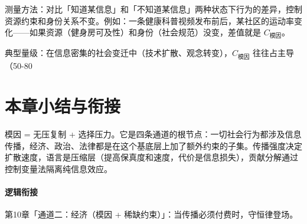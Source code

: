 \documentclass[../../main2.tex]{subfiles}
\begin{document}
	测量方法：对比「知道某信息」和「不知道某信息」两种状态下行为的差异，控制资源约束和身份关系不变。例如：一条健康科普视频发布前后，某社区的运动率变化——如果资源（健身房可及性）和身份（社会规范）没变，差值就是 $C_{\text{模因}}$。

	典型量级：在信息密集的社会变迁中（技术扩散、观念转变），$C_{\text{模因}}$ 往往占主导（50-80%
	\section{本章小结与衔接}
	模因 = 无压复制 + 选择压力。它是四条通道的根节点：一切社会行为都涉及信息传播，经济、政治、法律都是在这个基底层上加了额外约束的子集。传播强度决定扩散速度，语言是压缩层（提高保真度和速度，代价是信息损失），贡献分解通过控制变量法隔离纯信息效应。

	\paragraph*{逻辑衔接}
	第10章「通道二：经济（模因 + 稀缺约束）」：当传播必须付费时，守恒律登场。
\end{document}
